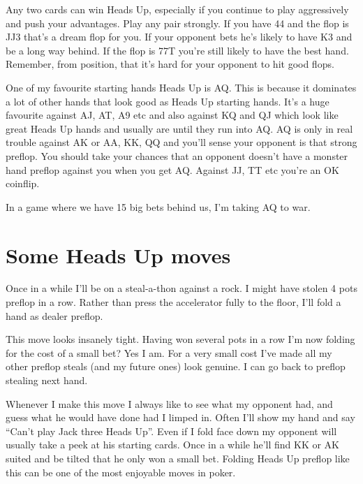 Any two cards can win Heads Up, especially if you continue
to play aggressively and push your advantages. Play any
pair strongly. If you have 44 and the flop is JJ3 that's
a dream flop for you. If your opponent bets he's likely
to have K3 and be a long way behind. If the flop is 77T
you're still likely to have the best hand. Remember,
from position, that it's hard for your opponent to
hit good flops.

One of my favourite starting hands Heads Up is AQ.
This is because it dominates a lot of other hands
that look good as Heads Up starting hands.
It's a huge favourite against AJ, AT, A9 etc and also
against KQ and QJ which look like great Heads Up hands
and usually are until they run into AQ. AQ is only in
real trouble against AK or AA, KK, QQ and you'll
sense your opponent is that strong preflop. You should
take your chances that an opponent doesn't have a monster
hand preflop against you when you get AQ. Against JJ, TT
etc you're an OK coinflip.

In a game where we have 15 big bets behind us, I'm
taking AQ to war.

\section{Some Heads Up moves}

Once in a while I'll be on a steal-a-thon against
a rock. I might have stolen 4 pots preflop in a row.
Rather than press the accelerator fully to the floor,
I'll fold a hand as dealer preflop.

This move looks insanely tight. Having won several
pots in a row I'm now folding for the cost of a small bet?
Yes I am. For a very small cost I've made all my other
preflop steals (and my future ones) look genuine. I can go
back to preflop stealing next hand.

Whenever I make this move I always like to see what
my opponent had, and guess what he would have done had
I limped in. Often I'll show my hand and say ``Can't play
Jack three Heads Up''. Even if I fold face down my opponent
will usually take a peek at his starting cards. Once
in a while he'll find KK or AK suited and be tilted
that he only won a small bet. Folding Heads Up preflop
like this can be one of the most enjoyable moves in poker.


